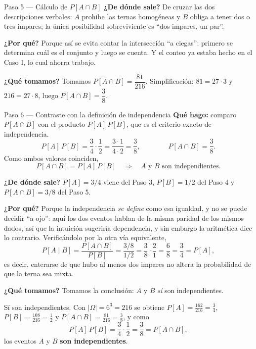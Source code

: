 \documentclass[11pt]{article}
\begin{document}
\begin{sol}
\begin{paso}{Paso 5 --- C\'alculo de $P[A\cap B]$}
\textbf{¿De d\'onde sale?} De cruzar las dos descripciones verbales: $A$ prohibe las ternas homog\'eneas y $B$ obliga a tener dos o tres impares; la \'unica posibilidad sobreviviente es ``dos impares, un par''.

\textbf{¿Por qu\'e?} Porque as\'i se evita contar la intersecci\'on ``a ciegas'': primero se determina cu\'al es el conjunto y luego se cuenta. Y el conteo ya estaba hecho en el Caso I, lo cual ahorra trabajo.

\textbf{¿Qu\'e tomamos?} Tomamos $P[A\cap B]=\dfrac{81}{216}$. Simplificaci\'on: $81=27\cdot 3$ y $216=27\cdot 8$, luego $P[A\cap B]=\dfrac{3}{8}$.
\end{paso}

\begin{paso}{Paso 6 --- Contraste con la definici\'on de independencia}
\textbf{Qu\'e hago:} comparo $P[A\cap B]$ con el producto $P[A]\,P[B]$, que es el criterio exacto de independencia.
\[
P[A]\,P[B]=\frac{3}{4}\cdot\frac{1}{2}=\frac{3\cdot 1}{4\cdot 2}=\frac{3}{8},
\qquad\qquad
P[A\cap B]=\frac{3}{8}.
\]
Como ambos valores coinciden,
\[
P[A\cap B]=P[A]\,P[B]
\quad\Longrightarrow\quad
A \text{ y } B \text{ son independientes.}
\]

\textbf{¿De d\'onde sale?} $P[A]=3/4$ viene del Paso 3, $P[B]=1/2$ del Paso 4 y $P[A\cap B]=3/8$ del Paso 5.

\textbf{¿Por qu\'e?} Porque la independencia \emph{se define} como esa igualdad, y no se puede decidir ``a ojo'': aqu\'i los dos eventos hablan de la misma paridad de los mismos dados, as\'i que la intuici\'on sugerir\'ia dependencia, y sin embargo la aritm\'etica dice lo contrario. Verific\'andolo por la otra v\'ia equivalente,
\[
P[A\mid B]=\frac{P[A\cap B]}{P[B]}=\frac{3/8}{1/2}=\frac{3}{8}\cdot\frac{2}{1}=\frac{6}{8}=\frac{3}{4}=P[A],
\]
es decir, enterarse de que hubo al menos dos impares no altera la probabilidad de que la terna sea mixta.

\textbf{¿Qu\'e tomamos?} Tomamos la conclusi\'on: $A$ y $B$ \emph{s\'i} son independientes.
\end{paso}

\end{sol}

\begin{resp}
S\'i son independientes. Con $|\Omega|=6^{3}=216$ se obtiene $P[A]=\frac{162}{216}=\frac{3}{4}$, $P[B]=\frac{108}{216}=\frac{1}{2}$ y $P[A\cap B]=\frac{81}{216}=\frac{3}{8}$, y como
\[
P[A]\,P[B]=\frac{3}{4}\cdot\frac{1}{2}=\frac{3}{8}=P[A\cap B],
\]
los eventos $A$ y $B$ \textbf{son independientes}.
\end{resp}
\end{document}
